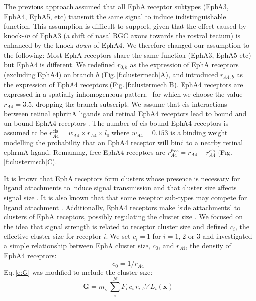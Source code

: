 \documentclass[11pt, a4paper]{article}
\begin{document}
The previous approach assumed that all EphA receptor subtypes (EphA3, EphA4, EphA5, etc) transmit the same signal to induce indistinguishable function.
This assumption is difficult to support, given that the effect caused by knock-\emph{in} of EphA3 (a shift of nasal RGC axons towards the rostral tectum) is enhanced by the knock-\emph{down} of EphA4. 
We therefore changed our assumption to the following: Most EphA receptors share the same function (EphA3, EphA5 etc) but EphA4 is different. 
We redefined $r_{\!\scriptscriptstyle 0,b}$ as the expression of EphA receptors (excluding EphA4) on branch $b$ (Fig.\,\ref{f:clustermech}A), and introduced $r_{\!\scriptscriptstyle A4,b}$ as the expression of EphA4 receptors (Fig.\,\ref{f:clustermech}B). EphA4 receptors are expressed in a spatially inhomogeneous pattern~\citep{reber_relative_2004} for which we choose the value $r_{\!\scriptscriptstyle A4} = 3.5$, dropping the branch subscript.  We assume that cis-interactions between retinal ephrinA ligands and retinal EphA4 receptors lead to bound and un-bound EphA4 receptors \citep{hornberger_modulation_1999}. The number of cis-bound EphA4 receptors is assumed to be $r_{\!\scriptscriptstyle A4}^{\mathrm{cis}} = w_{\!\scriptscriptstyle A4} \times r_{\!\scriptscriptstyle A4} \times l_0$ where $w_{\!\scriptscriptstyle A4} = 0.153$ is a binding weight modelling the probability that an EphA4 receptor will bind to a nearby retinal ephrinA ligand. Remaining, free EphA4 receptors are $r_{\!\scriptscriptstyle A4}^{\mathrm{free}} = r_{\!\scriptscriptstyle A4} - r_{\!\scriptscriptstyle A4}^{\mathrm{cis}}$ (Fig.\,\ref{f:clustermech}C). 

It is known that EphA receptors form clusters whose presence is necessary for ligand attachments to induce signal transmission and that cluster size affects signal size \citep{nikolov_ephephrin_2013}. It is also known that that some receptor sub-types may compete for ligand attachment \citep{fiore_regulation_2019}.
Additionally, EphA4 receptors make `side attachments' to clusters of EphA receptors, possibly regulating the cluster size \citep{nikolov_ephephrin_2013}. 
%
We focused on the idea that signal strength is related to receptor cluster size and defined $c_i$, the effective cluster size for receptor $i$. 
We set $c_i=1$ for $i=1$, $2$ or $3$ and investigated a simple relationship between EphA cluster size, $c_0$, and $r_{\!\scriptscriptstyle A4}$, the density of EphA4 receptors:
\begin{equation}
    c_0 = 1/r_{\!\scriptscriptstyle A4}
\end{equation}
%
Eq.\,\ref{e:G} was modified to include the cluster size:
%
\begin{equation}\label{e:Gcs}
\mathbf{G} = m_{\!_G}\,\sum_i^N F_i\,c_i\,r_{i,b} \nabla L_i(\mathbf{x})
\end{equation}
\end{document}
